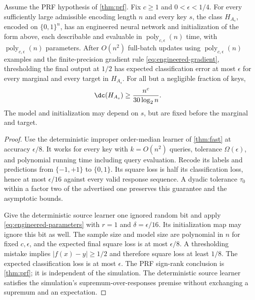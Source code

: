 \begin{corollary}\label{cor:engineered}
Assume the PRF hypothesis of \cref{thm:prf}. Fix $c\ge1$ and $0<\epsilon<1/4$. For every sufficiently large admissible encoding length $n$ and every key $s$, the class $H_{A_s}$, encoded on $\{0,1\}^n$, has an engineered neural network and initialization of the form above, each describable and evaluable in $\operatorname{poly}_{c,\epsilon}(n)$ time, with $\operatorname{poly}_{c,\epsilon}(n)$ parameters. After $O(n^2)$ full-batch updates using $\operatorname{poly}_{c,\epsilon}(n)$ examples and the finite-precision gradient rule \eqref{eq:engineered-gradient}, thresholding the final output at $1/2$ has expected classification error at most $\epsilon$ for every marginal and every target in $H_{A_s}$. For all but a negligible fraction of keys,
\[
 \dc(H_{A_s})\ge\frac{n^c}{30\log_2 n}.
\]
The model and initialization may depend on $s$, but are fixed before the marginal and target.
\end{corollary}

\begin{proof}
Use the deterministic improper order-median learner of \cref{thm:fast} at accuracy $\epsilon/8$. It works for every key with $k=O(n^2)$ queries, tolerance $\Omega(\epsilon)$, and polynomial running time including query evaluation. Recode its labels and predictions from $\{-1,+1\}$ to $\{0,1\}$. Its square loss is half its classification loss, hence at most $\epsilon/16$ against every valid response sequence. A dyadic tolerance $\tau_0$ within a factor two of the advertised one preserves this guarantee and the asymptotic bounds.

Give the deterministic source learner one ignored random bit and apply \eqref{eq:engineered-parameters} with $r=1$ and $\delta=\epsilon/16$. Its initialization map may ignore this bit as well. The sample size and model size are polynomial in $n$ for fixed $c,\epsilon$, and the expected final square loss is at most $\epsilon/8$. A thresholding mistake implies $|f(x)-y|\ge1/2$ and therefore square loss at least $1/8$. The expected classification loss is at most $\epsilon$. The PRF sign-rank conclusion is \cref{thm:prf}; it is independent of the simulation. The deterministic source learner satisfies the simulation's supremum-over-responses premise without exchanging a supremum and an expectation.
\end{proof}
